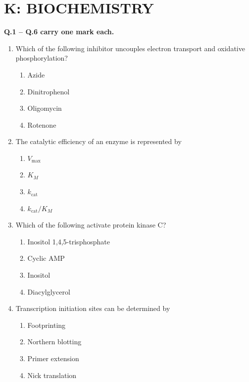 \documentclass[journal,12pt,onecolumn]{IEEEtran}
\begin{document}
\section*{\centering K: BIOCHEMISTRY}

\noindent \textbf{Q.1 -- Q.6 carry one mark each.}

\begin{enumerate}

\item Which of the following inhibitor uncouples electron transport and oxidative phosphorylation?
\begin{multicols}{4}
\begin{enumerate}[label=(\Alph*)]
\item Azide
\item Dinitrophenol
\item Oligomycin
\item Rotenone
\end{enumerate}
\end{multicols}

\item The catalytic efficiency of an enzyme is represented by
\begin{multicols}{4}
\begin{enumerate}[label=(\Alph*)]
\item $V_{\text{max}}$
\item $K_M$
\item $k_{\text{cat}}$
\item $k_{\text{cat}}/K_M$
\end{enumerate}
\end{multicols}

\item Which of the following activate protein kinase C?
\begin{multicols}{4}
\begin{enumerate}[label=(\Alph*)]
\item Inositol 1,4,5-trisphosphate
\item Cyclic AMP
\item Inositol
\item Diacylglycerol
\end{enumerate}
\end{multicols}

\item Transcription initiation sites can be determined by
\begin{multicols}{4}
\begin{enumerate}[label=(\Alph*)]
\item Footprinting
\item Northern blotting
\item Primer extension
\item Nick translation
\end{enumerate}
\end{multicols}


\end{enumerate}
\end{document}
